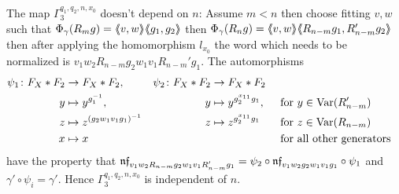 \documentclass[a4paper,11pt]{amsart}
\begin{document}
 The map $\Gamma_3^{q_1,q_2,n,x_0}$ doesn't depend on %
 $n$: Assume $m<n$ then choose  
 fitting $v,w$ such that $\Phi_\gamma(R_mg)=\langle\negthickspace\langle v,w\rangle\negthickspace\rangle\langle\negthickspace\langle g_1,g_2\rangle\negthickspace\rangle$ then $\Phi_\gamma(R_ng)=\langle\negthickspace\langle v,w\rangle\negthickspace\rangle\langle\negthickspace\langle R_{n-m}g_1,R_{n-m}'g_2\rangle\negthickspace\rangle$ 
 then after applying the homomorphism $l_{x_0}$ 
 the word which needs to be normalized is $v_1w_2R_{n-m}g_2w_1v_1R_{n-m}'g_1$. The automorphisms
 \begin{align*}
 \psi_1 \colon F_X*F_2 &\to F_X*F_2, & \psi_2 \colon F_X*F_2 &\to F_X*F_2\\
 y &\mapsto y^{g_1^{-1}}, & y &\mapsto y^{g_2^{x_{11}}g_1}, & &\text{ for }y\in \textup{Var}(R_{n-m}')\\
 z &\mapsto z^{(g_2w_1v_1g_1)^{-1}}& z &\mapsto z^{g_2^{x_{11}}g_1}  & &\text{ for }z\in \textup{Var}(R_{n-m})\\
 x &\mapsto x & & & &\text{ for all other generators}
 \end{align*}
 have the property that $\mathfrak{nf}_{v_1w_2R_{n-m}g_2w_1v_1R_{n-m}'g_1} = \psi_2\circ\mathfrak{nf}_{v_1w_2g_2w_1v_1g_1}\circ \psi_1$ and 
 $\gamma' \circ \psi_i = \gamma'$. Hence $\Gamma_3^{q_1,q_2,n,x_0}$ is independent of $n$.
 
\end{document}
